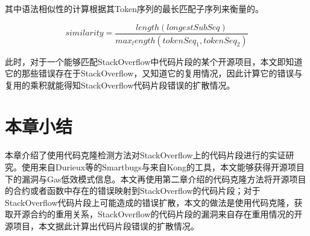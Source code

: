 其中语法相似性的计算根据其Token序列的最长匹配子序列\cite{longestSeries}来衡量的。

\begin{equation}
    similarity = \frac{length(longestSubSeq)}{max_length(tokenSeq_{1}, tokenSeq_{2})}
\end{equation}



此时，对于一个能够匹配StackOverflow中代码片段的某个开源项目，本文即知道它的那些错误存在于StackOverflow，又知道它的复用情况，因此计算它的错误与复用的乘积就能得知StackOverflow代码片段错误的扩散情况。

\section{本章小结}

本章介绍了使用代码克隆检测方法对StackOverflow上的代码片段进行的实证研究。使用来自Durieux等\cite{tool_paper}的Smartbugs与来自Kong\cite{gasPattern}的工具，本文能够获得开源项目下的漏洞与Gas低效模式信息。本文再使用第二章介绍的代码克隆方法将开源项目的合约或者函数中存在的错误映射到StackOverflow的代码片段；对于StackOverflow代码片段上可能造成的错误扩散，本文的做法是使用代码克隆，获取开源合约的重用关系，StackOverflow的代码片段的漏洞来自存在重用情况的开源项目，本文据此计算出代码片段错误的扩散情况。